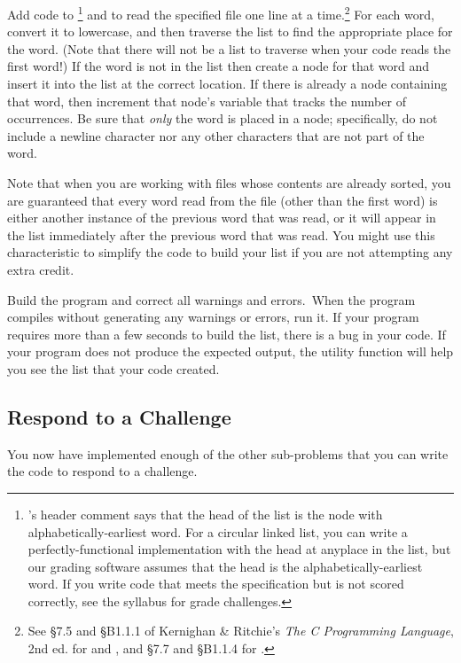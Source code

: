 Add code to \footnote{'s header comment says that the head of the list is the node with alphabetically-earliest word.
    For a circular linked list, you can write a perfectly-functional implementation with the head at anyplace in the list, but our grading software assumes that the head is the alphabetically-earliest word.
    If you write code that meets the specification but is not scored correctly, see the syllabus for grade challenges.}
and  to read the specified file one line at a time.\footnote{See \S7.5 and \S{}B1.1.1 of Kernighan \& Ritchie's \textit{The C Programming Language}, 2nd ed. for  and , and \S7.7 and \S{}B1.1.4 for .}
For each word, convert it to lowercase, and then traverse the list to find the appropriate place for the word.
(Note that there will not be a list to traverse when your code reads the first word!)
If the word is not in the list then create a node for that word and insert it into the list at the correct location.
If there is already a node containing that word, then increment that node's variable that tracks the number of occurrences.
Be sure that \textit{only} the word is placed in a node;
specifically, do not include a newline character nor any other characters that are not part of the word.

Note that when you are working with files whose contents are already sorted, you are guaranteed that every word read from the file (other than the first word) is either another instance of the previous word that was read, or it will appear in the list immediately after the previous word that was read.
You might use this characteristic to simplify the code to build your list if you are not attempting any extra credit.

Build the program and correct all warnings and errors.\ When the program compiles without generating any warnings or errors, run it.
If your program requires more than a few seconds to build the list, there is a bug in your code.
If your program does not produce the expected output, the  utility function will help you see the list that your code created.

\subsection{Respond to a Challenge}

You now have implemented enough of the other sub-problems that you can write the code to respond to a challenge.

